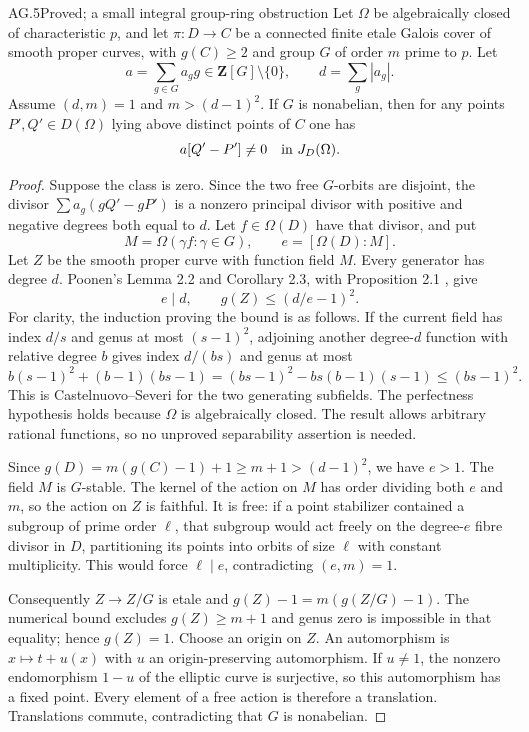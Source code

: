 \begin{claim}{AG.5}{Proved; a small integral group-ring obstruction}
Let $\Omega$ be algebraically closed of characteristic $p$, and
let $\pi:D\to C$ be a connected finite etale Galois cover of
smooth proper curves, with $g(C)\ge2$ and group $G$ of order
$m$ prime to $p$. Let
\[
 a=\sum_{g\in G}a_g g\in\mathbf Z[G]\setminus\{0\},
 \qquad d=\sum_g|a_g|.
\]
Assume $(d,m)=1$ and $m>(d-1)^2$. If $G$ is nonabelian,
then for any points $P',Q'\in D(\Omega)$ lying above distinct
points of $C$ one has
\[
                         a[Q'-P']\ne0\quad\hbox{in }J_D(\Omega).
\]
\end{claim}
\begin{proof}
Suppose the class is zero. Since the two free $G$-orbits are
disjoint, the divisor $\sum a_g(gQ'-gP')$ is a nonzero
principal divisor with positive and negative degrees both
equal to $d$. Let $f\in\Omega(D)$ have that divisor, and put
\[
 M=\Omega(\gamma f:\gamma\in G),\qquad
 e=[\Omega(D):M].
\]
Let $Z$ be the smooth proper curve with function field $M$.
Every generator has degree $d$. Poonen's Lemma 2.2 and
Corollary 2.3, with Proposition 2.1
\cite{AG_Poonen2007}, give
\[
                 e\mid d,\qquad g(Z)\le(d/e-1)^2.
\]
For clarity, the induction proving the bound is as follows.
If the current field has index $d/s$ and genus at most
$(s-1)^2$, adjoining another degree-$d$ function with relative
degree $b$ gives index $d/(bs)$ and genus at most
\[
 b(s-1)^2+(b-1)(bs-1)
   =(bs-1)^2-bs(b-1)(s-1)\le(bs-1)^2.
\]
This is Castelnuovo--Severi for the two generating subfields.
The perfectness hypothesis holds because $\Omega$ is
algebraically closed. The result allows arbitrary rational
functions, so no unproved separability assertion is needed.

Since $g(D)=m(g(C)-1)+1\ge m+1>(d-1)^2$, we have $e>1$.
The field $M$ is $G$-stable. The kernel of the action on $M$
has order dividing both $e$ and $m$, so the action on $Z$ is
faithful. It is free: if a point stabilizer contained a subgroup
of prime order $\ell$, that subgroup would act freely on the
degree-$e$ fibre divisor in $D$, partitioning its points into
orbits of size $\ell$ with constant multiplicity. This would
force $\ell\mid e$, contradicting $(e,m)=1$.

Consequently $Z\to Z/G$ is etale and
$g(Z)-1=m(g(Z/G)-1)$. The numerical bound excludes
$g(Z)\ge m+1$ and genus zero is impossible in that equality;
hence $g(Z)=1$. Choose an origin on $Z$. An automorphism is
$x\mapsto t+u(x)$ with $u$ an origin-preserving automorphism.
If $u\ne1$, the nonzero endomorphism $1-u$ of the elliptic
curve is surjective, so this automorphism has a fixed point.
Every element of a free action is therefore a translation.
Translations commute, contradicting that $G$ is nonabelian.
\end{proof}

